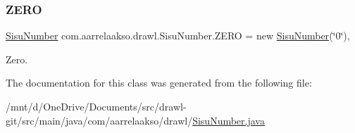 \subsubsection{\texorpdfstring{Z\+E\+RO}{ZERO}}
{\footnotesize\ttfamily \hyperlink{classcom_1_1aarrelaakso_1_1drawl_1_1_sisu_number}{Sisu\+Number} com.\+aarrelaakso.\+drawl.\+Sisu\+Number.\+Z\+E\+RO = new \hyperlink{classcom_1_1aarrelaakso_1_1drawl_1_1_sisu_number}{Sisu\+Number}(\char`\"{}0\char`\"{})\hspace{0.3cm}{\ttfamily [static]}, {\ttfamily [protected]}}



Zero. 



The documentation for this class was generated from the following file\+:\begin{DoxyCompactItemize}
\item 
/mnt/d/\+One\+Drive/\+Documents/src/drawl-\/git/src/main/java/com/aarrelaakso/drawl/\hyperlink{_sisu_number_8java}{Sisu\+Number.\+java}\end{DoxyCompactItemize}
